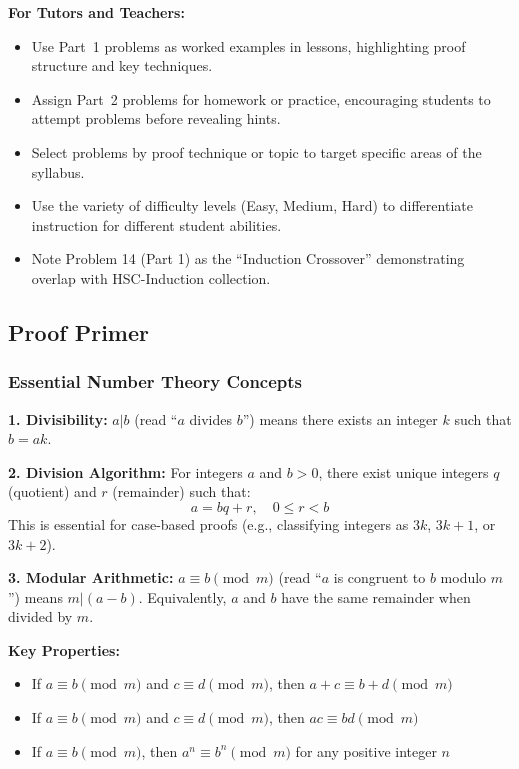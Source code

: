 \documentclass[12pt]{article}
\begin{document}
\textbf{For Tutors and Teachers:}
\begin{itemize}[leftmargin=*]
  \item Use Part~1 problems as worked examples in lessons, highlighting proof structure and key techniques.
  \item Assign Part~2 problems for homework or practice, encouraging students to attempt problems before revealing hints.
  \item Select problems by proof technique or topic to target specific areas of the syllabus.
  \item Use the variety of difficulty levels (Easy, Medium, Hard) to differentiate instruction for different student abilities.
  \item Note Problem 14 (Part 1) as the ``Induction Crossover'' demonstrating overlap with HSC-Induction collection.
\end{itemize}

\subsection{Proof Primer}

\subsubsection*{Essential Number Theory Concepts}

\textbf{1. Divisibility:} $a | b$ (read ``$a$ divides $b$'') means there exists an integer $k$ such that $b = ak$.

\textbf{2. Division Algorithm:} For integers $a$ and $b > 0$, there exist unique integers $q$ (quotient) and $r$ (remainder) such that:
\[ a = bq + r, \quad 0 \le r < b \]
This is essential for case-based proofs (e.g., classifying integers as $3k$, $3k+1$, or $3k+2$).

\textbf{3. Modular Arithmetic:} $a \equiv b \pmod{m}$ (read ``$a$ is congruent to $b$ modulo $m$'') means $m | (a-b)$. Equivalently, $a$ and $b$ have the same remainder when divided by $m$.

\textbf{Key Properties:}
\begin{itemize}
    \item If $a \equiv b \pmod{m}$ and $c \equiv d \pmod{m}$, then $a+c \equiv b+d \pmod{m}$
    \item If $a \equiv b \pmod{m}$ and $c \equiv d \pmod{m}$, then $ac \equiv bd \pmod{m}$
    \item If $a \equiv b \pmod{m}$, then $a^n \equiv b^n \pmod{m}$ for any positive integer $n$
\end{itemize}
\end{document}
